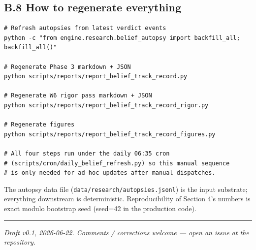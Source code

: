 \documentclass[11pt,a4paper]{article}
\begin{document}
\subsection{B.8 How to regenerate everything}

\begin{lstlisting}
# Refresh autopsies from latest verdict events
python -c "from engine.research.belief_autopsy import backfill_all; backfill_all()"

# Regenerate Phase 3 markdown + JSON
python scripts/reports/report_belief_track_record.py

# Regenerate W6 rigor pass markdown + JSON
python scripts/reports/report_belief_track_record_rigor.py

# Regenerate figures
python scripts/reports/report_belief_track_record_figures.py

# All four steps run under the daily 06:35 cron
# (scripts/cron/daily_belief_refresh.py) so this manual sequence
# is only needed for ad-hoc updates after manual dispatches.
\end{lstlisting}

The autopsy data file (\texttt{data/research/autopsies.jsonl}) is the input substrate; everything downstream is deterministic. Reproducibility of Section 4's numbers is exact modulo bootstrap seed (seed=42 in the production code).

\medskip\hrule\medskip

\textit{Draft v0.1, 2026-06-22. Comments / corrections welcome — open an issue at the repository.}
\end{document}

